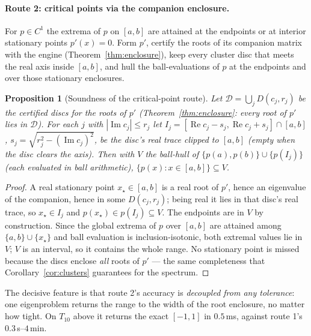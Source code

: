 \documentclass[11pt,a4paper]{article}
\newcommand{\abs}[1]{\left|#1\right|}
\theoremstyle{plain}
\newtheorem{proposition}[theorem]{Proposition}
\theoremstyle{definition}
\begin{document}
\paragraph{Route 2: critical points via the companion enclosure.} For $p\in C^1$ the
extrema of $p$ on $[a,b]$ are attained at the endpoints or at interior stationary points
$p'(x)=0$. Form $p'$, certify the roots of its companion matrix with the engine
(Theorem~\ref{thm:enclosure}), keep every cluster disc that meets the real axis inside
$[a,b]$, and hull the ball-evaluations of $p$ at the endpoints and over those stationary
enclosures.

\begin{proposition}[Soundness of the critical-point route]\label{prop:polyrange}
Let $\mathcal D=\bigcup_j D(c_j,r_j)$ be the certified discs for the roots of $p'$
(Theorem~\ref{thm:enclosure}: every root of $p'$ lies in $\mathcal D$). For each $j$ with
$\abs{\operatorname{Im}c_j}\le r_j$ let $I_j=[\operatorname{Re}c_j-s_j,\operatorname{Re}c_j+s_j]\cap[a,b]$,
$s_j=\sqrt{r_j^2-(\operatorname{Im}c_j)^2}$, be the disc's real trace clipped to $[a,b]$
(empty when the disc clears the axis). Then with $V$ the ball-hull of
$\{p(a),p(b)\}\cup\{p(I_j)\}$ (each evaluated in ball arithmetic),
$\{p(x):x\in[a,b]\}\subseteq V$.
\end{proposition}
\begin{proof}
A real stationary point $x_\star\in[a,b]$ is a real root of $p'$, hence an eigenvalue of the
companion, hence in some $D(c_j,r_j)$; being real it lies in that disc's real trace, so
$x_\star\in I_j$ and $p(x_\star)\in p(I_j)\subseteq V$. The endpoints are in $V$ by
construction. Since the global extrema of $p$ over $[a,b]$ are attained among
$\{a,b\}\cup\{x_\star\}$ and ball evaluation is inclusion-isotonic, both extremal values lie
in $V$; $V$ is an interval, so it contains the whole range. No stationary point is missed
because the discs enclose \emph{all} roots of $p'$ --- the same completeness that
Corollary~\ref{cor:clusters} guarantees for the spectrum.
\end{proof}

The decisive feature is that route 2's accuracy is \emph{decoupled from any tolerance}: one
eigenproblem returns the range to the width of the root enclosure, no matter how tight. On
$T_{10}$ above it returns the exact $[-1,1]$ in $0.5$\,ms, against route 1's $0.3$\,s--$4$\,min.
\end{document}
